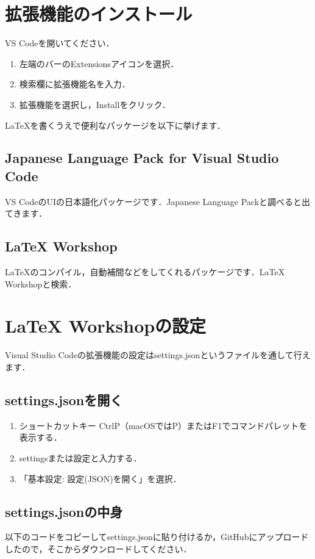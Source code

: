 \documentclass[a4paper,dvipdfmx]{jsreport}
\begin{document}
\section{拡張機能のインストール}
VS Codeを開いてください．

\begin{enumerate}
    \item 左端のバーのExtensionsアイコンを選択．
    \item 検索欄に拡張機能名を入力．
    \item 拡張機能を選択し，Installをクリック．
\end{enumerate}

\LaTeX を書くうえで便利なパッケージを以下に挙げます．

\subsection{Japanese Language Pack for Visual Studio Code}
VS CodeのUIの日本語化パッケージです．Japanese Language Packと調べると出てきます．

\subsection{LaTeX Workshop}
\LaTeX のコンパイル，自動補間などをしてくれるパッケージです．LaTeX Workshopと検索．

\section{LaTeX Workshopの設定}
Visual Studio Codeの拡張機能の設定はsettings.jsonというファイルを通して行えます．

\subsection{settings.jsonを開く}
\begin{enumerate}
    \item ショートカットキー CtrlP（macOSではP）またはF1でコマンドパレットを表示する．
    \item settingsまたは設定と入力する．
    \item 「基本設定: 設定(JSON)を開く」を選択．
\end{enumerate}

\subsection{settings.jsonの中身}
以下のコードをコピーしてsettings.jsonに貼り付けるか，GitHubにアップロードしたので，そこからダウンロードしてください．
\end{document}
